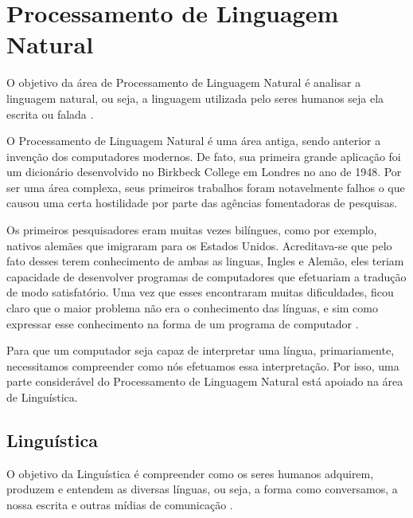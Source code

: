 \chapter{Processamento de Linguagem Natural}
\label{cap:Processamento}


O objetivo da área de Processamento de Linguagem Natural é analisar a linguagem
natural, ou seja, a linguagem utilizada pelo seres humanos seja ela escrita
ou falada \cite{manningschutze1999}.

O Processamento de Linguagem Natural é uma área antiga, sendo anterior a
invenção dos computadores modernos. De fato, sua primeira grande aplicação foi
um dicionário desenvolvido no Birkbeck College em Londres no ano de 1948. Por ser
uma área complexa, seus primeiros trabalhos foram notavelmente falhos o que
causou uma certa hostilidade por parte das agências fomentadoras de pesquisas.

Os primeiros pesquisadores eram muitas vezes bilíngues, como por exemplo,
nativos alemães que imigraram para os Estados Unidos. Acreditava-se que pelo
fato desses terem conhecimento de ambas as linguas, Ingles e Alemão, eles teriam
capacidade de desenvolver programas de computadores que efetuariam a tradução
de modo satisfatório. Uma vez que esses encontraram muitas dificuldades,
ficou claro que o maior problema não era o conhecimento das
línguas, e sim como expressar esse conhecimento na forma de um programa de
computador \cite{history}.

Para que um computador seja capaz de interpretar uma
língua, primariamente, necessitamos compreender como nós efetuamos essa
interpretação.
Por isso, uma parte considerável do Processamento de Linguagem Natural está apoiado na área de Linguística.

\section{Linguística}

O objetivo da Linguística é compreender como os seres humanos adquirem, produzem
e entendem as diversas línguas, ou seja, a forma como conversamos, a nossa
escrita e outras mídias de comunicação \cite{manningschutze1999}.

